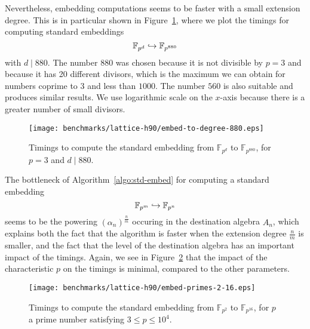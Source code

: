Nevertheless, embedding computations seems to be faster with a small extension
degree. This is in particular shown in Figure~\ref{fig:embed-to-880}, where we
plot the timings for computing standard embeddings
\[
  \mathbb{F}_{p^d}\hookrightarrow\mathbb{F}_{p^{880}}
\]
with $d\mid880$. The number $880$ was chosen because it is not divisible by
$p=3$ and because it has 20 different divisors, which is the maximum we can
obtain for numbers coprime to $3$ and less than $1000$. The number $560$ is
also suitable and produces similar results. We use logarithmic scale on the
$x$-axis because there is a greater number of small divisors.
\begin{figure}
  \centering
  \texttt{[image: benchmarks/lattice-h90/embed-to-degree-880.eps]}
  \caption{Timings to compute the standard embedding from $\mathbb{F}_{p^d}$ to
  $\mathbb{F}_{p^{880}}$, for $p=3$ and $d\mid880$.}
  \label{fig:embed-to-880}
\end{figure}
The bottleneck of Algorithm~\ref{algo:std-embed} for computing a standard
embedding
\[
  \mathbb{F}_{p^m}\hookrightarrow\mathbb{F}_{p^{n}}
\]
seems to be the powering $(\alpha_n)^{\frac{n}{m}}$ occuring in the destination algebra
$A_n$, which explains both the fact
that the algorithm is faster when the extension degree $\frac{n}{m}$ is smaller,
and the fact that the level of the destination algebra has an important impact
of the timings.
Again, we see in Figure~\ref{fig:embed-primes} that the impact of the
characteristic $p$ on the timings is minimal, compared to the other parameters.
\begin{figure}
  \centering
  \texttt{[image: benchmarks/lattice-h90/embed-primes-2-16.eps]}
  \caption{Timings to compute the standard embedding from $\mathbb{F}_{p^2}$ to
  $\mathbb{F}_{p^{16}}$, for $p$ a prime number satisfying $3\leq p \leq 10^4$.}
  \label{fig:embed-primes}
\end{figure}

